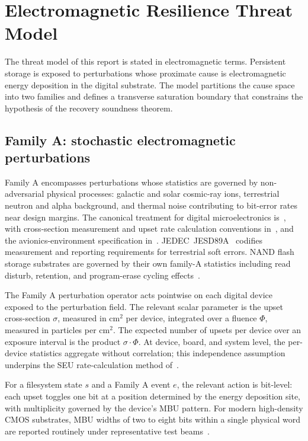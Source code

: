 \section{Electromagnetic Resilience Threat Model}\label{sec:emr-threat}

The threat model of this report is stated in electromagnetic terms.
Persistent storage is exposed to perturbations whose proximate cause
is electromagnetic energy deposition in the digital substrate. The
model partitions the cause space into two families and defines a
transverse saturation boundary that constrains the hypothesis of the
recovery soundness theorem.

\subsection{Family A: stochastic electromagnetic perturbations}

Family A encompasses perturbations whose statistics are governed by
non-adversarial physical processes: galactic and solar cosmic-ray
ions, terrestrial neutron and alpha background, and thermal noise
contributing to bit-error rates near design margins. The canonical
treatment for digital microelectronics
is~\cite{dodd2003,baumann2005}, with cross-section measurement and
upset rate calculation conventions
in~\cite{petersen1996,heinrich1977}, and the avionics-environment
specification in~\cite{normand1996}. JEDEC~JESD89A~\cite{jedec89a}
codifies measurement and reporting requirements for terrestrial
soft errors. NAND flash storage substrates are governed by their
own family-A statistics including read disturb, retention, and
program-erase cycling effects~\cite{cai2017nand,mielke2017}.

The Family A perturbation operator acts pointwise on each digital
device exposed to the perturbation field. The relevant scalar
parameter is the upset cross-section \(\sigma\), measured in cm\(^2\)
per device, integrated over a fluence \(\Phi\), measured in
particles per cm\(^2\). The expected number of upsets per device
over an exposure interval is the product \(\sigma \cdot \Phi\). At
device, board, and system level, the per-device statistics
aggregate without correlation; this independence assumption
underpins the SEU rate-calculation method of~\cite{heinrich1977}.

For a filesystem state \(s\) and a Family A event \(e\), the
relevant action is bit-level: each upset toggles one bit at a
position determined by the energy deposition site, with
multiplicity governed by the device's MBU pattern. For modern
high-density CMOS substrates, MBU widths of two to eight bits
within a single physical word are reported routinely under
representative test
beams~\cite{baumann2005,jedec89a,cai2017nand,mielke2017}.

